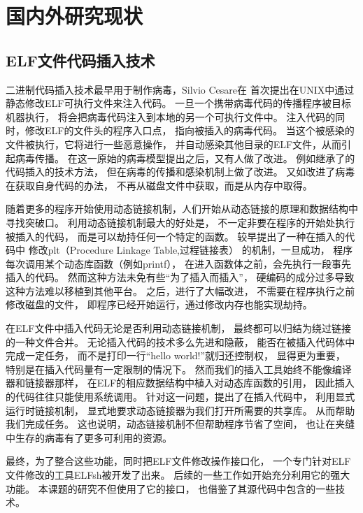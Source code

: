 \section{国内外研究现状}

\subsection{ELF文件代码插入技术}

二进制代码插入技术最早用于制作病毒，Silvio Cesare在\cite{silvio}
首次提出在UNIX中通过静态修改ELF可执行文件来注入代码。
一旦一个携带病毒代码的传播程序被目标机器执行，
将会把病毒代码注入到本地的另一个可执行文件中。
注入代码的同时，修改ELF的文件头的程序入口点，
指向被插入的病毒代码。
当这个被感染的文件被执行，它将进行一些恶意操作，
并自动感染其他目录的ELF文件，从而引起病毒传播。
在这一原始的病毒模型提出之后，又有人做了改进。
例如\cite{simple}继承了\cite{silvio}的代码插入的技术方法，
但在病毒的传播和感染机制上做了改进。
又如\cite{prototype}改进了病毒在获取自身代码的办法，
不再从磁盘文件中获取，而是从内存中取得。


随着更多的程序开始使用动态链接机制，人们开始从动态链接的原理和数据结构中
寻找突破口。
利用动态链接机制最大的好处是，
不一定非要在程序的开始处执行被插入的代码，
而是可以劫持任何一个特定的函数。
\cite{sharelib}较早提出了一种在插入的代码中
修改plt（Procedure Linkage Table,过程链接表）
的机制，一旦成功，
程序每次调用某个动态库函数（例如printf），
在进入函数体之前，会先执行一段事先插入的代码。
然而这种方法未免有些“为了插入而插入”，
硬编码的成分过多导致这种方法难以移植到其他平台。
之后，\cite{modern}进行了大幅改进，
不需要在程序执行之前修改磁盘的文件，
即程序已经开始运行，通过修改内存也能实现劫持。

在ELF文件中插入代码无论是否利用动态链接机制，
最终都可以归结为绕过链接的一种文件合并。
无论插入代码的技术多么先进和隐蔽，
能否在被插入代码体中完成一定任务，
而不是打印一行“hello world!”就归还控制权，
显得更为重要，
特别是在插入代码量有一定限制的情况下。
然而我们的插入工具始终不能像编译器和链接器那样，
在ELF的相应数据结构中植入对动态库函数的引用，
因此插入的代码往往只能使用系统调用。
针对这一问题，\cite{subversive}提出了在插入代码中，
利用显式运行时链接机制，
显式地要求动态链接器为我们打开所需要的共享库。
从而帮助我们完成任务。
这也说明，动态链接机制不但帮助程序节省了空间，
也让在夹缝中生存的病毒有了更多可利用的资源。


最终，为了整合这些功能，同时把ELF文件修改操作接口化，
一个专门针对ELF文件修改的工具ELFsh被开发了出来。
后续的一些工作如\cite{cerberus}开始充分利用它的强大功能。
本课题的研究不但使用了它的接口，
也借鉴了其源代码中包含的一些技术。


